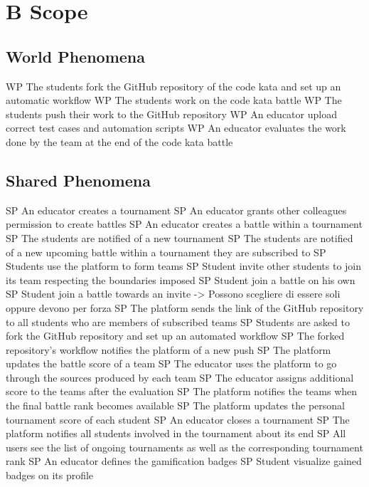 \blindtext
\section{B Scope}

    \subsection{World Phenomena}
        WP The students fork the GitHub repository of the code kata and set up an automatic workflow
        WP The students work on the code kata battle
        WP The students push their work to the GitHub repository
        WP An educator upload correct test cases and automation scripts
        WP An educator evaluates the work done by the team at the end of the code kata battle

    \subsection{Shared Phenomena}
        SP An educator creates a tournament
        SP An educator grants other colleagues permission to create battles
        SP An educator creates a battle within a tournament
        SP The students are notified of a new tournament
        SP The students are notified of a new upcoming battle within a tournament they are subscribed to
        SP Students use the platform to form teams
        SP Student invite other students to join its team respecting the boundaries imposed
        SP Student join a battle on his own
        SP Student join a battle towards an invite -> Possono scegliere di essere soli oppure devono per forza 
        SP The platform sends the link of the GitHub repository to all students who are members of subscribed teams
        SP Students are asked to fork the GitHub repository and set up an automated workflow
        SP The forked repository's workflow notifies the platform of a new push
        SP The platform updates the battle score of a team 
        SP The educator uses the platform to go through the sources produced by each team
        SP The educator assigns additional score to the teams after the evaluation
        SP The platform notifies the teams when the final battle rank becomes available
        SP The platform updates the personal tournament score of each student
        SP An educator closes a tournament
        SP The platform notifies all students involved in the tournament about its end
        SP All users see the list of  ongoing tournaments as well as the corresponding tournament rank
        SP An educator defines the gamification badges
        SP Student visualize gained badges on its profile
        
